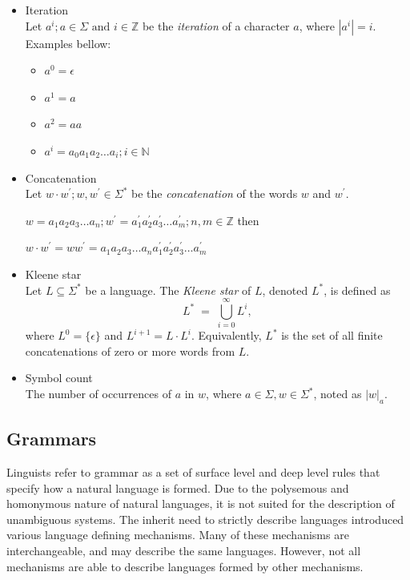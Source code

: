 \begin{itemize}
\item Iteration\\
  Let $a^i; a \in \Sigma \text{ and } i \in \mathbb{Z}$ be the \emph{iteration} of a character $a$, where $|a^i| = i$.\\
Examples bellow:


\begin{itemize}
\item $a^0 = \epsilon$
\item $a^1 = a$
\item $a^2 = aa$
\item $a^i = a_0 a_1 a_2 \dots a_i; i \in \mathbb{N}$
\end{itemize}


\item Concatenation\\
  Let $w \cdot w^{'}; w, w^{'} \in \Sigma^{*}$ be the \emph{concatenation} of the words $w$ and $w^{'}$.

$w = a_1 a_2 a_3 \dots a_n ; w^{'} = a^{'}_1 a^{'}_2 a^{'}_3 \dots a^{'}_m; n,m \in \mathbb{Z}$ then  

$w\cdot w^{'} = w w^{'} = a_1 a_2 a_3 \dots a_n a^{'}_1 a^{'}_2 a^{'}_3 \dots a^{'}_m$


\item Kleene star\\
  Let $L \subseteq \Sigma^{*}$ be a language. The \emph{Kleene star} of $L$, denoted $L^{*}$, is defined as
  \[
    L^{*} \;=\; \bigcup_{i=0}^{\infty} L^{i},
  \]
  where $L^{0} = \{\epsilon\}$ and $L^{i+1} = L \cdot L^{i}$.  Equivalently, $L^{*}$ is the set of all finite concatenations of zero or more words from $L$.\\

\item Symbol count\\
The number of occurrences of $a$ in $w$, where $a \in \Sigma, w \in \Sigma^{*}$, noted as $|w|_{a}$.

\end{itemize}

\subsection{Grammars}
Linguists refer to grammar as a set of surface level and deep level rules that specify how a natural language is formed. Due to the polysemous and homonymous nature of natural languages, it is not suited for the description of unambiguous systems. The inherit need to strictly describe languages introduced various language defining mechanisms. Many of these mechanisms are interchangeable, and may describe the same languages. However, not all mechanisms are able to describe languages formed by other mechanisms.

